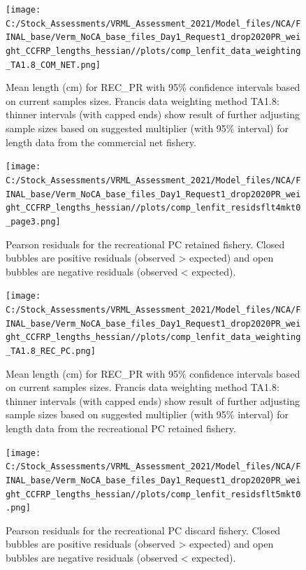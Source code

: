 \documentclass[11pt,
  english,
]{article}
\begin{document}
\begin{figure}
\centering
\texttt{[image: C:/Stock\_Assessments/VRML\_Assessment\_2021/Model\_files/NCA/FINAL\_base/Verm\_NoCA\_base\_files\_Day1\_Request1\_drop2020PR\_weight\_CCFRP\_lengths\_hessian//plots/comp\_lenfit\_data\_weighting\_TA1.8\_COM\_NET.png]}
\caption{Mean length (cm) for REC\_PR with 95\% confidence intervals based on current samples sizes. Francis data weighting method TA1.8: thinner intervals (with capped ends) show result of further adjusting sample sizes based on suggested multiplier (with 95\% interval) for length data from the commercial net fishery.\label{fig:mean-len-fit-COM-NET}}
\end{figure}

\begin{figure}
\centering
\texttt{[image: C:/Stock\_Assessments/VRML\_Assessment\_2021/Model\_files/NCA/FINAL\_base/Verm\_NoCA\_base\_files\_Day1\_Request1\_drop2020PR\_weight\_CCFRP\_lengths\_hessian//plots/comp\_lenfit\_residsflt4mkt0\_page3.png]}
\caption{Pearson residuals for the recreational PC retained fishery. Closed bubbles are positive residuals (observed \textgreater{} expected) and open bubbles are negative residuals (observed \textless{} expected).\label{fig:len-pearson-REC-PC}}
\end{figure}

\begin{figure}
\centering
\texttt{[image: C:/Stock\_Assessments/VRML\_Assessment\_2021/Model\_files/NCA/FINAL\_base/Verm\_NoCA\_base\_files\_Day1\_Request1\_drop2020PR\_weight\_CCFRP\_lengths\_hessian//plots/comp\_lenfit\_data\_weighting\_TA1.8\_REC\_PC.png]}
\caption{Mean length (cm) for REC\_PR with 95\% confidence intervals based on current samples sizes. Francis data weighting method TA1.8: thinner intervals (with capped ends) show result of further adjusting sample sizes based on suggested multiplier (with 95\% interval) for length data from the recreational PC retained fishery.\label{fig:mean-len-fit-REC-PC}}
\end{figure}

\begin{figure}
\centering
\texttt{[image: C:/Stock\_Assessments/VRML\_Assessment\_2021/Model\_files/NCA/FINAL\_base/Verm\_NoCA\_base\_files\_Day1\_Request1\_drop2020PR\_weight\_CCFRP\_lengths\_hessian//plots/comp\_lenfit\_residsflt5mkt0.png]}
\caption{Pearson residuals for the recreational PC discard fishery. Closed bubbles are positive residuals (observed \textgreater{} expected) and open bubbles are negative residuals (observed \textless{} expected).\label{fig:len-pearson-REC-PC-DIS}}
\end{figure}
\end{document}
